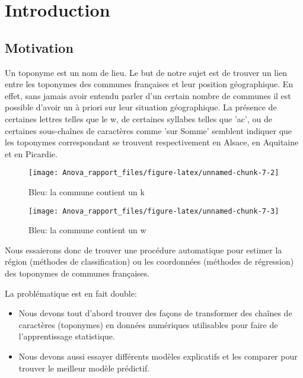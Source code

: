 \documentclass[french]{article}%
\begin{document}
	
	
	\newpage
	
	\section*{Introduction}
	
		\subsection*{Motivation}
		
				Un toponyme est un nom de lieu. Le but de notre sujet est de trouver un lien entre les toponymes des communes françaises et leur position géographique. En effet, sans jamais avoir entendu parler d'un certain nombre de communes il est possible d'avoir un à priori sur leur situation géographique. La présence de certaines lettres telles que le w, de certaines syllabes telles que 'ac', ou de certaines sous-chaînes de caractères comme 'sur Somme' semblent indiquer que les toponymes correspondant se trouvent respectivement en Alsace, en Aquitaine et en Picardie.
				
				\begin{figure}
					\centering
					\texttt{[image: Anova\_rapport\_files/figure-latex/unnamed-chunk-7-2]}
					\caption[Représentation des communes selon la présence de la lettre k]{Bleu: la commune contient un k}
					\label{k}
				\end{figure}
				
				\begin{figure}
					\centering
					\texttt{[image: Anova\_rapport\_files/figure-latex/unnamed-chunk-7-3]}
					\caption[Représentation des communes selon la présence de la lettre w]{Bleu: la commune contient un w}
					\label{w}
				\end{figure}
			
			
				Nous essaierons donc de trouver une procédure automatique pour estimer la région (méthodes de classification) ou les coordonnées (méthodes de régression) des toponymes de communes françaises. 
				
				La problématique est en fait double:
				
				\begin{itemize}
					
					\item Nous devons tout d'abord trouver des façons de transformer des chaînes de caractères (toponymes) en données numériques utilisables pour faire de l'apprentissage statistique.
					
					\item Nous devons aussi essayer différents modèles explicatifs et les comparer pour trouver le meilleur modèle prédictif.
					
				\end{itemize}
				
\end{document}
